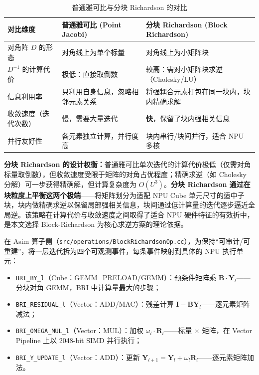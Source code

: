 \documentclass{CjC}
\begin{document}
    \begin{table}[H]
        \centering
        \caption{普通雅可比与分块 Richardson 的对比}
        \begin{tabular}{p{3.2cm} p{5.5cm} p{5.5cm}}
            \toprule \textbf{对比维度} & \textbf{普通雅可比 (Point Jacobi)} & \textbf{分块 Richardson (Block Richardson)} \\
            \midrule 对角阵 $D$ 的形态   & 对角线上为单个标量                     & 对角线上为小矩阵块                                 \\
            $D^{-1}$ 的计算代价         & 极低：直接取倒数                      & 较高：需对小矩阵块求逆（Cholesky/LU）                  \\
            信息利用率                  & 只利用自身信息，忽略相邻元素关系              & 将强耦合元素打包在同一块内，块内精确求解                      \\
            收敛速度（迭代次数）             & 慢，需要大量迭代                      & \textbf{快}，保留了块内强相关信息                     \\
            并行友好性                  & 各元素独立计算，并行度高                  & 块内串行/块间并行，适合 NPU 多核                       \\
            \bottomrule
        \end{tabular}
    \end{table}

    \textbf{分块 Richardson 的设计权衡：}普通雅可比单次迭代的计算代价极低（仅需对角标量取倒数），但收敛速度受限于矩阵的对角占优程度；精确求逆（如
    Cholesky 分解）可一步获得精确解，但计算复杂度为 $O(U^{3})$。\textbf{分块
    Richardson 通过在块粒度上平衡这两个极端}——将矩阵划分为适配 NPU Cube
    单元尺寸的适中子块，块内做精确求逆以保留局部强相关信息，块间通过低计算量的迭代逐步逼近全局逆。该策略在计算代价与收敛速度之间取得了适合
    NPU 硬件特征的有效折中，是本文选择 Block-Richardson
    为核心求逆方案的理论依据。

    在 Asim 算子侧（\texttt{src/operations/BlockRichardsonOp.cc}），为保持“可审计/可重建”，将一层迭代拆为四个可观测事件，每条事件映射到具体的
    NPU 执行单元：
    \begin{itemize}
        \item \texttt{BRI\_BY\_l}（Cube：GEMM\_PRELOAD/GEMM）：预条件矩阵乘 $\bm{B}
            \cdot\bm{Y}_{l}$——分块对角 GEMM，BRI 中计算量最大的步骤；

        \item \texttt{BRI\_RESIDUAL\_l}（Vector：ADD/MAC）：残差计算 $\bm{I}-\bm{BY}
            _{l}$——逐元素矩阵减法；

        \item \texttt{BRI\_OMEGA\_MUL\_l}（Vector：MUL）：加权 $\omega_{l}\cdot\bm
            {R}_{l}$——标量 $\times$ 矩阵，在 Vector Pipeline 上以 2048-bit SIMD
            并行执行；

        \item \texttt{BRI\_Y\_UPDATE\_l}（Vector：ADD）：更新 $\bm{Y}_{l+1}=\bm{Y}
            _{l}+\omega_{l}\bm{R}_{l}$——逐元素矩阵加法。
    \end{itemize}
\end{document}
